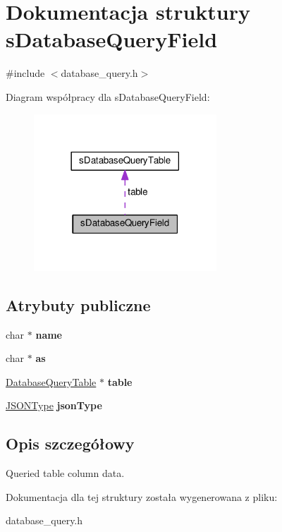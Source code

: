 \hypertarget{structsDatabaseQueryField}{}\section{Dokumentacja struktury s\+Database\+Query\+Field}
\label{structsDatabaseQueryField}


{\ttfamily \#include $<$database\+\_\+query.\+h$>$}



Diagram współpracy dla s\+Database\+Query\+Field\+:\nopagebreak
\begin{figure}[H]
\begin{center}
\leavevmode
\includegraphics[width=194pt]{structsDatabaseQueryField__coll__graph}
\end{center}
\end{figure}
\subsection*{Atrybuty publiczne}
\begin{DoxyCompactItemize}
\item 
char $\ast$ {\bfseries name}\hypertarget{structsDatabaseQueryField_a89dd83131d90a8d8aeabfcafdde956b0}{}\label{structsDatabaseQueryField_a89dd83131d90a8d8aeabfcafdde956b0}

\item 
char $\ast$ {\bfseries as}\hypertarget{structsDatabaseQueryField_a97d3648cdd9355173c5e1f2322050473}{}\label{structsDatabaseQueryField_a97d3648cdd9355173c5e1f2322050473}

\item 
\hyperlink{structsDatabaseQueryTable}{Database\+Query\+Table} $\ast$ {\bfseries table}\hypertarget{structsDatabaseQueryField_a32161fc1b757bde0390ae5f3ef50c7c4}{}\label{structsDatabaseQueryField_a32161fc1b757bde0390ae5f3ef50c7c4}

\item 
\hyperlink{json_8h_af761d54284482a1af5a01d8f52845b49}{J\+S\+O\+N\+Type} {\bfseries json\+Type}\hypertarget{structsDatabaseQueryField_a6e0fe90cd89abdc82116cc61be5119d5}{}\label{structsDatabaseQueryField_a6e0fe90cd89abdc82116cc61be5119d5}

\end{DoxyCompactItemize}


\subsection{Opis szczegółowy}
Queried table column data. 

Dokumentacja dla tej struktury została wygenerowana z pliku\+:\begin{DoxyCompactItemize}
\item 
database\+\_\+query.\+h\end{DoxyCompactItemize}
